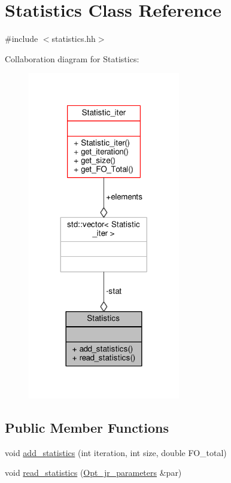 \hypertarget{classStatistics}{\section{Statistics Class Reference}
\label{classStatistics}
}


{\ttfamily \#include $<$statistics.\-hh$>$}



Collaboration diagram for Statistics\-:
\nopagebreak
\begin{figure}[H]
\begin{center}
\leavevmode
\includegraphics[width=188pt]{classStatistics__coll__graph}
\end{center}
\end{figure}
\subsection*{Public Member Functions}
\begin{DoxyCompactItemize}
\item 
void \hyperlink{classStatistics_addca8205d4c1946fe5af6a1385419c79}{add\-\_\-statistics} (int iteration, int size, double F\-O\-\_\-total)
\item 
void \hyperlink{classStatistics_a57df73491ae4c84a8c3b08d912d2ce8e}{read\-\_\-statistics} (\hyperlink{classOpt__jr__parameters}{Opt\-\_\-jr\-\_\-parameters} \&par)
\end{DoxyCompactItemize}

